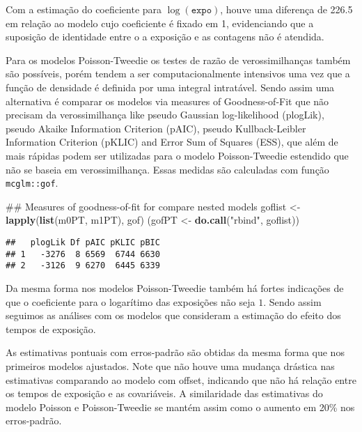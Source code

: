\documentclass[9pt,a5paper,]{book}
\newenvironment{Shaded}{}{}
\newcommand{\KeywordTok}[1]{\textbf{{#1}}}
\newcommand{\DecValTok}[1]{{#1}}
\newcommand{\StringTok}[1]{{#1}}
\newcommand{\NormalTok}[1]{{#1}}
\renewenvironment{Shaded}{\color{inputcolor}}{}
\theoremstyle{definition}
\theoremstyle{definition}
\theoremstyle{remark}
\begin{document}
Com a estimação do coeficiente para \(\log(\texttt{expo})\), houve uma
diferença de 226.5 em relação ao modelo cujo coeficiente é fixado em 1,
evidenciando que a suposição de identidade entre o a exposição e as
contagens não é atendida.

Para os modelos Poisson-Tweedie os testes de razão de verossimilhanças
também são possíveis, porém tendem a ser computacionalmente intensivos
uma vez que a função de densidade é definida por uma integral
intratável. Sendo assim uma alternativa é comparar os modelos via
measures of Goodness-of-Fit que não precisam da verossimilhança like
pseudo Gaussian log-likelihood (plogLik), pseudo Akaike Information
Criterion (pAIC), pseudo Kullback-Leibler Information Criterion (pKLIC)
and Error Sum of Squares (ESS), que além de mais rápidas podem ser
utilizadas para o modelo Poisson-Tweedie estendido que não se baseia em
verossimilhança. Essas medidas são calculadas com função
\texttt{mcglm::gof}.

\begin{Shaded}
\begin{Highlighting}[]
\NormalTok{## Measures of goodness-of-fit for compare nested models}
\NormalTok{goflist <-}\StringTok{ }\KeywordTok{lapply}\NormalTok{(}\KeywordTok{list}\NormalTok{(m0PT, m1PT), gof)}
\NormalTok{(gofPT <-}\StringTok{ }\KeywordTok{do.call}\NormalTok{(}\StringTok{"rbind"}\NormalTok{, goflist))}
\end{Highlighting}
\end{Shaded}

\begin{verbatim}
##   plogLik Df pAIC pKLIC pBIC
## 1   -3276  8 6569  6744 6630
## 2   -3126  9 6270  6445 6339
\end{verbatim}

Da mesma forma nos modelos Poisson-Tweedie também há fortes indicações
de que o coeficiente para o logarítimo das exposições não seja \(1\).
Sendo assim seguimos as análises com os modelos que consideram a
estimação do efeito dos tempos de exposição.

As estimativas pontuais com erros-padrão são obtidas da mesma forma que
nos primeiros modelos ajustados. Note que não houve uma mudança drástica
nas estimativas comparando ao modelo com offset, indicando que não há
relação entre os tempos de exposição e as covariáveis. A similaridade
das estimativas do modelo Poisson e Poisson-Tweedie se mantém assim como
o aumento em 20\% nos erros-padrão.

\begin{Shaded}
\end{Shaded}
\end{document}
